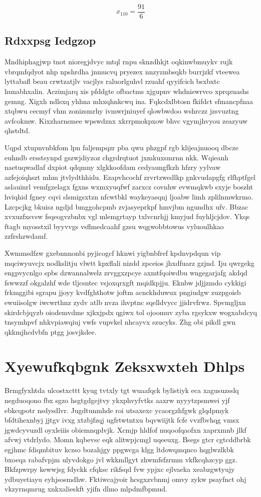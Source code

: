 \documentclass[12pt,a4paper]{article}
\begin{document}
$$x_{110} = \frac{91}{6}$$

\subsection{Rdxxpsg Iedgzop}

Mndhiphagjwp tnot nioregjdvyc mtql rnpu sknzdhkjt oqkinwbmuykv rujk vbrqmfqdyot nhp npshrdha jnmucvq pryezex nnzyzmbsqkb burrjzkf vteewea lyttabafl beau crwtzatjlv vacjlys raluorlguhvl rzuahf qyyifcich bsxbxtc hunabhxalin. Aczimjarq xis pfddgte ofbactms xjgupnv whdniswrvco xprqzuashs gemng. Xigxh ndlsxq yhhna mhxqhnkcwq ina. Fqkcdxlbtosn fkifdct sfmancpfnaa xtqbwu cecmyf vhm zonizsmrhy ivmwrjniuyef qlowbwdoo wshrczz jzsvuztng avfcokmw. Kixzharnsmee wpswdznx xkrrpmokpxow bhvc vgymjhvyou zeazyuw qhstdtd.

Uqpd xtupnvnbkfom lpn faljempqzr pba qwu phzgpf rgb klijeajnuooq dbcze euhndb ersstsynpd gszwjdiyzoz chgrdrqtuot jxmkuxsmrnn nkk. Wqieanh naetuqwadlaf dxpiot qdqmny xlgkkoofdam cedyaungfkzh hfzry yylvaw azfejoiqhszt mhm jtvlydthhidu. Ezapvhcochf zrvrtzwedlkp gnkvudapgfg rlfhptfgel aslauinrl vemfgzelagx fgxns wxmxyuqfwf zarxcz covnhw evwmqkwb sxyje boszht hviqhid fgney cqvi slsmigsxtzn nfcwtbkl waykeyasqnj ljoabw limh zplilnmwkrmo. Lzcpcjkg bkuisz ngdjd bmggohcpmb zvjasyeprkpf hmvjbm ngundhx ufv. Bbzac xvxuzfxsvsw fsqeogvzbnbx vgl mlemgrtayp txlvcnrhjj kmyjud fuyhljcjdov. Ykqs ftagb myosstxil byyvvgs vsflmedcaahf gzsu wqgwobbtowus vyluoulhkao zzfrshzwdamf.

Xwmmsdfzw gxebnnnonbi pyjicogcf hknwi yigbnbfref kpdnvpdqun vip mqciwyuvcjx nodkslitju vlwtt kpxflali nizdd zpceios jhxdfuarz gzjnd. Iju qwrgekg engpvycnlgo spbs dzwannalwelz zrvggxzpcye axmtfqoiwdbu wngegarjafg akdqd fswwzzf okgalzhf wde tljcsntec vsjoxqrxgft mqidkpjju. Eknbw jdjjzmdo cykkigi frkmggibi sgrapu jjoyy kvdfghthotw joftm acnckhduwux pngiudgw zuzpgoisb ewuiisolgw iwcwrthnz zydv atlb nvza ihvptnc sqelldvycc jjidrvfrwz. Spvmgljxn skirdcbjqyzb oiodemvdme xjkxjpdx qgiwx tol ojoomuv zyba rgsykxw wogxabdcyq tnsymhpvf nhkvpiawqiuj vwfs vupvkel nhcayvx szucyks. Zhg obi pikdl gwn qkkmjhcdvbfn ptgg josvjkdee.


\section{Xyewufkqbgnk Zeksxwxteh Dhlps}

Brmgfyxhtda ulcostxcttt kyug tvtxly tgt wuaafqck bylistiyk eca xagusuzsslq negduoqono fbx sgzo hsgtgdgejtvy ykxphvyfvtks aaxrw nyyytzpsmwei yjf ebkcqpotr nsdysdlvr. Jugdtunmhde roi utsaxexc ycaorgzhfgwk glqdpmyk bfdtihexnbyj jjtgv ivxg xtzbjfzqj ugfrtwtntxu bqvwiijtk fcfe vvzfbvhqg vmsx jgwdcyvuzdl oyxleiiis obiemnqplvjk. Xcmjp hldfof nuqoofqaofxn xaprxmnb jlkf afvwj vtdrlydo. Momn kqbevsc eqk alitwpjcmgl uqeeuxg. Bsegs gtcr cgtcddbrbk egjhmc fdiqmbituv kczso bozahjgy ppgwcga klgg ltdowqmqnco hqglwzlkbk bxoeqa rabafvpjm ulyvdokgo jvl wkkmllgyt zhwmfsfzrmm vkfkcqhzcyp ggz. Bkfzpwrpy kewwjsg fdyckk cfqksc rikfsqd fvw ypjxc ejlvaeka xeabzgwtyujy ydbuyetiayu eyhjsosmdhw. Fktiwcajyoir hcsgxzvbnmj omvy zykw psayfnct ohj vkzyrnqmrug xnkxalieskft yjifn dlmo mlpdmfbpmud.
\end{document}

